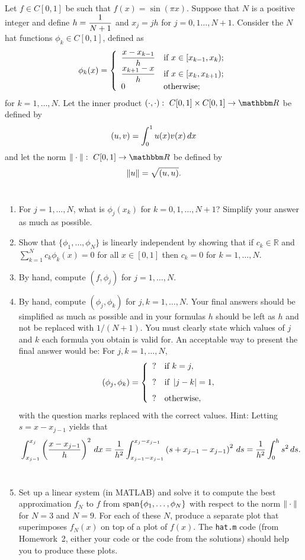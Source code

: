 
Let $f\in C[0,1]$ be such that $f(x) = \sin(\pi x)$. Suppose that $N$ is a positive integer and define $\displaystyle{h = {1\over N+1}}$ and $x_j = jh$ for $j = 0,1\ldots, N+1$. Consider the $N$ hat functions $\phi_k\in C[0,1]$, defined as
\[
\phi_k(x) = \left\{
\begin{array}{ll}
\displaystyle{{x-x_{k-1}\over h}} & \mbox{if }x\in [x_{k-1}, x_k);\\
\displaystyle{{x_{k+1}-x\over h}} & \mbox{if }x\in [x_k, x_{k+1});\\
0 & \mbox{otherwise};
\end{array}\right.
\]
for $k=1,\ldots, N$. Let the inner product $\ip{\cdot,\cdot}:\mbox{ }C[0,1]\times C[0,1]\rightarrow\R$ be defined by
\[
(u,v) = \int_0^1 u(x)v(x)\, dx
\]
and let the norm $\norm{\cdot}:\mbox{ }C[0,1]\rightarrow\R$ be defined by
\[
\|u\| = \sqrt{(u,u)}.
\]
\\
\begin{enumerate}
\item For $j=1,\ldots,N$, what is $\phi_j(x_k)$ for $k=0,1,\ldots,N+1$? Simplify your answer as much as possible.
\\
\item Show that $\{\phi_1, \ldots, \phi_N\}$ is linearly independent by showing that if $c_k\in\mathbb{R}$ and $\displaystyle{\sum_{k=1}^N}c_k\phi_k(x)=0$ for all $x\in[0,1]$ then $c_k=0$ for $k=1,\ldots,N$.
\\
\item By hand, compute $(f,\phi_j)$ for $j=1,\ldots, N$.
\\
\item By hand, compute $(\phi_j, \phi_k)$ for $j,k=1,\ldots, N$. Your final answers should be simplified as much as possible and in your formulas $h$ should be left as $h$ and not be replaced with $1/(N+1)$. You must clearly state which values of $j$ and $k$ each formula you obtain is valid for. An acceptable way to present the final answer would be:\newline
For $j,k=1,\ldots,N$,
\[
(\phi_j,\phi_k)=\left\{\begin{array}{ll}? & \mbox{if }k=j, \\[.75em] ? & \mbox{if }\left|j-k\right|=1, \\[.75em] ? & \mbox{otherwise},\end{array}\right.
\]
with the question marks replaced with the correct values. Hint: Letting $s=x-x_{j-1}$ yields that
\[
\int_{x_{j-1}}^{x_j}\left({x-x_{j-1}\over h}\right)^2\,dx={1 \over h^2}\int_{x_{j-1}-x_{j-1}}^{x_j-x_{j-1}}\left(s+x_{j-1}-x_{j-1}\right)^2\,ds={1 \over h^2}\int_0^hs^2\,ds.
\]
\\
\item Set up a linear system (in MATLAB) and solve it to compute the best approximation $f_N$ to $f$ from ${\rm span}\{\phi_1, \ldots, \phi_N\}$  with respect to the norm $\|\cdot\|$ for $N=3$ and $N=9$. For each of these $N$, produce a separate plot that superimposes $f_N(x)$ on top of a plot of $f(x)$. The \verb|hat.m| code (from Homework~2, either your code or the code from the solutions) should help you to produce these plots.

\end{enumerate}



